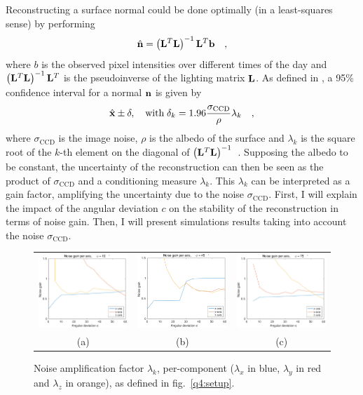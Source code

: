 \documentclass{report}
\begin{document}
Reconstructing a surface normal could be done optimally (in a least-squares sense) by performing
\begin{equation}
\hat{\mathbf{n}} = \left( \mathbf{L}^T\mathbf{L}\right)^{-1} \mathbf{L}^T \mathbf{b}
\quad,
\end{equation}
where $b$ is the observed pixel intensities over different times of the day and $\left( \mathbf{L}^T\mathbf{L}\right)^{-1} \mathbf{L}^T$ is the pseudoinverse of the lighting matrix $\mathbf{L}$.
As defined in \cite{holdgeoffroy-3dv-15}, a 95\% confidence interval for a normal $\mathbf{n}$ is given by
\begin{equation}
\hat{\mathbf{x}} \pm \mathbf{\delta} , \quad \text{with} \; \delta_k = 1.96\frac{\sigma_{\text{CCD}}}{\rho}\lambda_k
\quad,
\end{equation}
where $\sigma_\text{CCD}$ is the image noise, $\rho$ is the albedo of the surface and $\lambda_k$ is the square root of the $k$-th element on the diagonal of $\left(\mathbf{L}^T\mathbf{L}\right)^{-1}$~\cite{Hastie-09}.
Supposing the albedo to be constant, the uncertainty of the reconstruction can then be seen as the product of $\sigma_\text{CCD}$ and a conditioning measure $\lambda_k$. This $\lambda_k$ can be interpreted as a gain factor, amplifying the uncertainty due to the noise $\sigma_\text{CCD}$. First, I will explain the impact of the angular deviation $c$ on the stability of the reconstruction in terms of noise gain. Then, I will present simulations results taking into account the noise $\sigma_\text{CCD}$.

\begin{figure}
  \centering
  \begin{tabular}{ccc}
  \includegraphics[width=0.30\linewidth]{q4_noise_10.pdf} &
  \includegraphics[width=0.30\linewidth]{q4_noise_45.pdf} &
  \includegraphics[width=0.30\linewidth]{q4_noise_75.pdf} \\
  (a) &
  (b) &
  (c)
  \end{tabular}
  \caption[Per-component noise amplification factor]
   {Noise amplification factor $\lambda_k$, per-component ($\lambda_x$ in blue, $\lambda_y$ in red and $\lambda_z$ in orange), as defined in fig.~\ref{q4:setup}.}
  \label{q4:lambda}
\end{figure}
\end{document}
